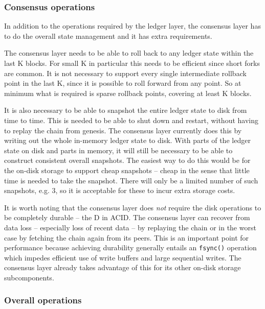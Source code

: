 \documentclass[11pt,a4paper]{article}
\begin{document}
\subsubsection{Consensus operations}

In addition to the operations required by the ledger layer, the consensus layer
has to do the overall state management and it has extra requirements.

The consensus layer needs to be able to roll back to any ledger state within the
last K blocks. For small K in particular this needs to be efficient since short
forks are common. It is not necessary to support every single intermediate
rollback point in the last K, since it is possible to roll forward from any
point. So at minimum what is required is sparse rollback points, covering at
least K blocks.

It is also necessary to be able to snapshot the entire ledger state to disk
from time to time. This is needed to be able to shut down and restart, without
having to replay the chain from genesis. The consensus layer currently does
this by writing out the whole in-memory ledger state to disk. With parts of
the ledger state on disk and parts in memory, it will still be necessary to
be able to construct consistent overall snapshots. The easiest way to do this
would be for the on-disk storage to support cheap snapshots -- cheap in the
sense that little time is needed to take the snapshot. There will only be a
limited number of such snapshots, e.g. 3, so it is acceptable for these to
incur extra storage costs.

It is worth noting that the consensus layer does \emph{not} require the disk
operations to be completely durable -- the D in ACID. The consensus layer can
recover from data loss -- especially loss of recent data -- by replaying the
chain or in the worst case by fetching the chain again from its peers. This is
an important point for performance because achieving durability generally
entails an {\tt fsync()} operation which impedes efficient use of write buffers
and large sequential writes. The consensus layer already takes advantage of
this for its other on-disk storage subcomponents.

\subsubsection{Overall operations}
\end{document}
